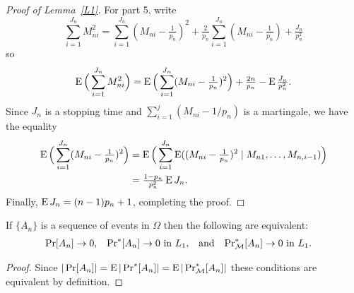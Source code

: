 \documentclass[11pt]{article}
\begin{document}
\begin{proof}[Proof of Lemma~\ref{L1}]
  For part 5, write
  \begin{equation}\label{eq:41}
    \sum_{i=1}^{J_n} M_{ni}^2 =
    \sum_{i=1}^{J_n} (M_{ni} - \tfrac{1}{p_n})^2
    + \tfrac{2}{p_n} \sum_{i=1}^{J_n} (M_{ni} - \tfrac{1}{p_n})
    + \tfrac{J_n}{p_n^2}
  \end{equation}
  so
  \begin{equation*}
    \operatorname{E} \Big( \sum_{i=1}^{J_n} M_{ni}^2 \Big)
    = \operatorname{E}\Big( \sum_{i=1}^{J_n} (M_{ni} - \tfrac{1}{p_n})^2 \Big)
    + \tfrac{2 n}{p_n} - \operatorname{E} \tfrac{J_n}{p_n^2}.
  \end{equation*}
  Since $J_n$ is a stopping time and $\sum_{i=1}^j (M_{ni} - 1/p_n)$
  is a martingale, we have the equality \citep[Lemma 6]{CRT:65}
  \begin{align*}
    \operatorname{E}\Big( \sum_{i=1}^{J_n} (M_{ni} - \tfrac{1}{p_n})^2 \Big)
    &= \operatorname{E}\Big( \sum_{i=1}^{J_n} \operatorname{E}((M_{ni} - \tfrac{1}{p_n})^2 \mid M_{n1},\dots,M_{n,i-1})\Big)\\
    &= \tfrac{1 - p_n}{p_n^2} \operatorname{E} J_n.
  \end{align*}
  Finally, $\operatorname{E} J_n = (n-1) p_n + 1$, completing the proof.
\end{proof}

\begin{lem}\label{L2}
  If $\{A_n\}$ is a sequence of events in $\Omega$ then the following
  are equivalent:
  \begin{align*}
  \operatorname{Pr}[A_n] &\to 0, &
  \operatorname{Pr}^*[A_n] &\to 0 \text{\ in\ }L_1, &
  &\text{and}&
  \operatorname{Pr}_{\mathcal{M}}^*[A_n] &\to 0 \text{\ in\ }L_1.
  \end{align*}
\end{lem}
\begin{proof}
  Since $|\operatorname{Pr}[A_n]| = \operatorname{E} |\operatorname{Pr}^*[A_n]| = \operatorname{E} |\operatorname{Pr}^*_{\mathcal{M}}[A_n]|$ these
  conditions are equivalent by definition.
\end{proof}
\end{document}
